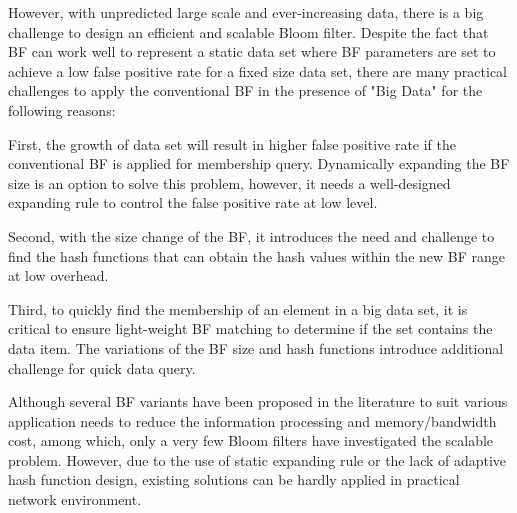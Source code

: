 \documentclass[10pt,journal,compsoc]{IEEEtran}
\begin{document}
However, with unpredicted large scale and ever-increasing data, there is a big challenge to design an efficient and scalable Bloom filter.
Despite the fact that BF can work well to represent a static data set where BF parameters are set to achieve a low false positive rate for a fixed size data set, there are many practical challenges to apply the conventional BF in the presence of "Big Data" for the following reasons:


First, the growth of data set will result in higher false positive rate if the conventional BF is applied for membership query. Dynamically expanding the BF size is an option to solve this problem, however, it needs a well-designed expanding rule to control the false positive rate at low level.

Second, with the size change of the BF, it introduces the need and challenge to find the hash functions that can obtain the hash values within the new BF range at low overhead.

Third, to quickly find the membership of an element in a big data set, it is critical to ensure light-weight BF matching to determine if the set contains the data item. The variations of the BF size and hash functions introduce additional challenge for quick data query.

Although several BF variants \cite{6848046,fan2000summary,mitzenmacher2002compressed,kumar2006space,deng2006approximately,dutta2012towards,dutta2013streaming,yoon2010aging,tree6848077,guo2006theory, xie2007scalable} have been proposed in the literature to suit
various application needs to reduce the information processing and memory/bandwidth cost,
among which, only a very few Bloom filters \cite{guo2006theory, wei2010mad2,almeida2007scalable,xie2007scalable} have investigated the scalable problem. However, due to the use of static expanding rule or the lack of adaptive hash function design, existing solutions can be hardly  applied in practical network environment.
\end{document}
